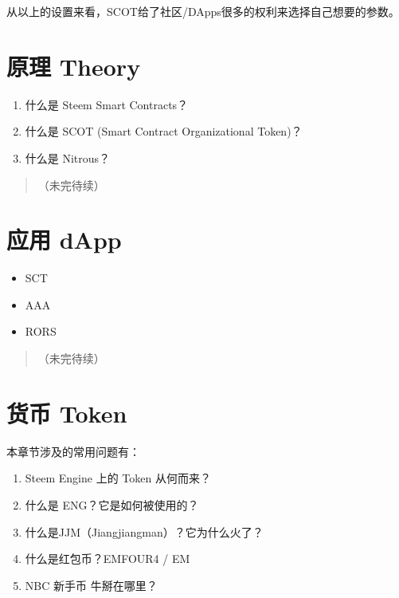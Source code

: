 \documentclass[]{ctexbook}
\providecommand{\tightlist}{%
  \setlength{\itemsep}{0pt}\setlength{\parskip}{0pt}}
\begin{document}
从以上的设置来看，SCOT给了社区/DApps很多的权利来选择自己想要的参数。

\hypertarget{theory}{%
\chapter{原理 Theory}\label{theory}}

\begin{enumerate}
\def\labelenumi{\arabic{enumi}.}
\tightlist
\item
  什么是 Steem Smart Contracts？
\item
  什么是 SCOT (Smart Contract Organizational Token)？
\item
  什么是 Nitrous？
\end{enumerate}

\begin{quote}
（未完待续）
\end{quote}

\hypertarget{dapp}{%
\chapter{应用 dApp}\label{dapp}}

\begin{itemize}
\tightlist
\item
  SCT
\item
  AAA
\item
  RORS
\end{itemize}

\begin{quote}
（未完待续）
\end{quote}

\hypertarget{token}{%
\chapter{货币 Token}\label{token}}

本章节涉及的常用问题有：

\begin{enumerate}
\def\labelenumi{\arabic{enumi}.}
\tightlist
\item
  Steem Engine 上的 Token 从何而来？
\item
  什么是 ENG？它是如何被使用的？
\item
  什么是JJM（Jiangjiangman）？它为什么火了？
\item
  什么是红包币？EMFOUR4 / EM
\item
  NBC 新手币 牛掰在哪里？
\end{enumerate}
\end{document}
